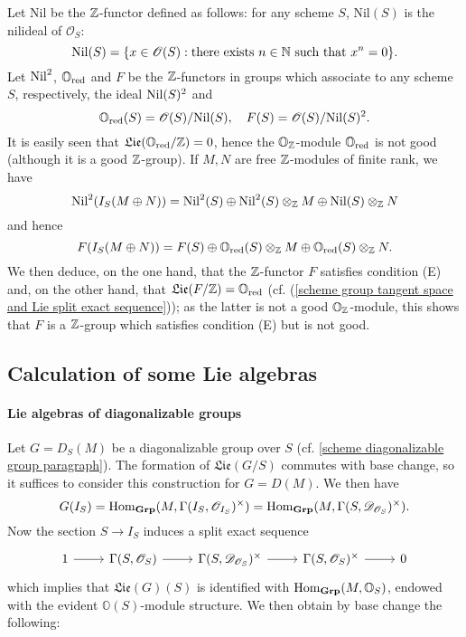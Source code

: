 \begin{example}\label{scheme group condition (E) but not good}
Let $\mathrm{Nil}$ be the $\mathbb{Z}$-functor defined as follows: for any scheme $S$, $\mathrm{Nil}(S)$ is the nilideal of $\mathscr{O}_S$:
\[\mathrm{Nil}(S)=\{x\in\mathscr{O}(S):\text{there exists $n\in\mathbb{N}$ such that $x^n=0$}\}.\]
Let $\mathrm{Nil}^2$, $\mathbb{O}_{\mathrm{red}}$ and $F$ be the $\mathbb{Z}$-functors in groups which associate to any scheme $S$, respectively, the ideal $\mathrm{Nil}(S)^2$ and \[\mathbb{O}_{\mathrm{red}}(S)=\mathscr{O}(S)/\mathrm{Nil}(S),\quad F(S)=\mathscr{O}(S)/\mathrm{Nil}(S)^2.\]
It is easily seen that $\mathfrak{Lie}(\mathbb{O}_{\mathrm{red}}/\mathbb{Z})=0$, hence the $\mathbb{O}_{\mathbb{Z}}$-module $\mathbb{O}_{\mathrm{red}}$ is not good (although it is a good $\mathbb{Z}$-group). If $M,N$ are free $\mathbb{Z}$-modules of finite rank, we have
\[\mathrm{Nil}^2(I_S(M\oplus N))=\mathrm{Nil}^2(S)\oplus\mathrm{Nil}^2(S)\otimes_{\mathbb{Z}}M \oplus\mathrm{Nil}(S)\otimes_{\mathbb{Z}}N\]
and hence
\[F(I_S(M\oplus N))=F(S)\oplus\mathbb{O}_{\mathrm{red}}(S)\otimes_{\mathbb{Z}}M\oplus\mathbb{O}_{\mathrm{red}}(S)\otimes_{\mathbb{Z}}N.\]
We then deduce, on the one hand, that the $\mathbb{Z}$-functor $F$ satisfies condition (E) and, on the other hand, that $\mathfrak{Lie}(F/\mathbb{Z})=\mathbb{O}_{\mathrm{red}}$ (cf. (\ref{scheme group tangent space and Lie split exact sequence})); as the latter is not a good $\mathbb{O}_{\mathbb{Z}}$-module, this shows that $F$ is a $\mathbb{Z}$-group which satisfies condition (E) but is not good.
\end{example}

\subsection{Calculation of some Lie algebras}
\paragraph{Lie algebras of diagonalizable groups}
Let $G=D_S(M)$ be a diagonalizable group over $S$ (cf. \ref{scheme diagonalizable group paragraph}). The formation of $\mathfrak{Lie}(G/S)$ commutes with base change, so it suffices to consider this construction for $G=D(M)$. We then have
\[G(I_S)=\mathrm{Hom}_{\mathbf{Grp}}(M,\Gamma(I_S,\mathscr{O}_{I_S})^\times)=\mathrm{Hom}_{\mathbf{Grp}}(M,\Gamma(S,\mathscr{D}_{\mathscr{O}_S})^\times).\]
Now the section $S\to I_S$ induces a split exact sequence
\[\begin{tikzcd}
1\ar[r]&\Gamma(S,\mathscr{O}_S)\ar[r]&\Gamma(S,\mathscr{D}_{\mathscr{O}_S})^\times\ar[r]&\Gamma(S,\mathscr{O}_S)^\times\ar[r]&0
\end{tikzcd}\]
which implies that $\mathfrak{Lie}(G)(S)$ is identified with $\mathrm{Hom}_{\mathbf{Grp}}(M,\mathbb{O}_S)$, endowed with the evident $\mathbb{O}(S)$-module structure. We then obtain by base change the following:

